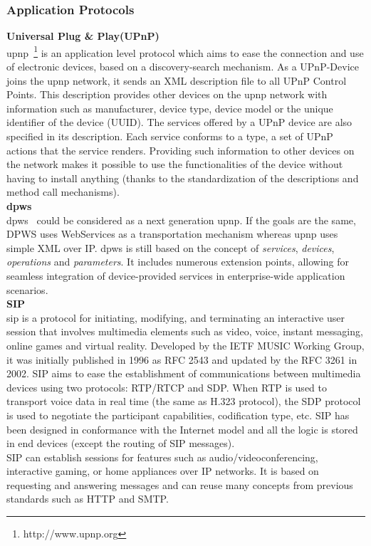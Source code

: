 \subsubsection{Application Protocols}

{\bf Universal Plug \& Play(UPnP)}\\
\gls{upnp}~\footnote{http://www.upnp.org} is an application level protocol which aims to ease the connection and use of electronic devices, based on a discovery-search mechanism. As a UPnP-Device joins the \gls{upnp} network, it sends an XML description file to all UPnP Control Points. This description provides other devices on the \gls{upnp} network with information such as manufacturer, device type, device model or the unique identifier of the device (UUID). The services offered by a UPnP device are also specified in its description. Each service conforms to a type, a set of UPnP actions that the service renders. Providing such information to other devices on the network makes it possible to use the functionalities of the device without having to install anything (thanks to the standardization of the descriptions and method call mechanisms).\\

{\bf \gls{dpws}}\\
\gls{dpws}~\cite{DPWS} could be considered as a next generation \gls{upnp}. If the goals are the same, DPWS uses WebServices as a transportation mechanism whereas \gls{upnp} uses simple XML over IP. \gls{dpws} is still based on the concept of \textit{services}, \textit{devices}, \textit{operations} and \textit{parameters}. It includes numerous extension points, allowing for seamless integration of device-provided services in enterprise-wide application scenarios.\\


{\bf SIP}\\
\gls{sip} is a protocol for initiating, modifying, and terminating an interactive user session that involves multimedia elements such as video, voice, instant messaging, online games and virtual reality. Developed by the IETF MUSIC Working Group, it was initially published in 1996 as RFC 2543 and updated by the RFC 3261 in 2002.
SIP aims to ease the establishment of communications between multimedia devices using two protocols: RTP/RTCP and SDP.
When RTP is used to transport voice data in real time (the same as H.323 protocol), the SDP protocol is used to negotiate the participant capabilities, codification type, etc.
SIP has been designed in conformance with the Internet model and all the logic is stored in end devices (except the routing of SIP messages).\\
SIP can establish sessions for features such as audio/videoconferencing, interactive gaming, or home appliances over IP networks. It is based on requesting and answering messages and can reuse many concepts from previous standards such as HTTP and SMTP.\\



